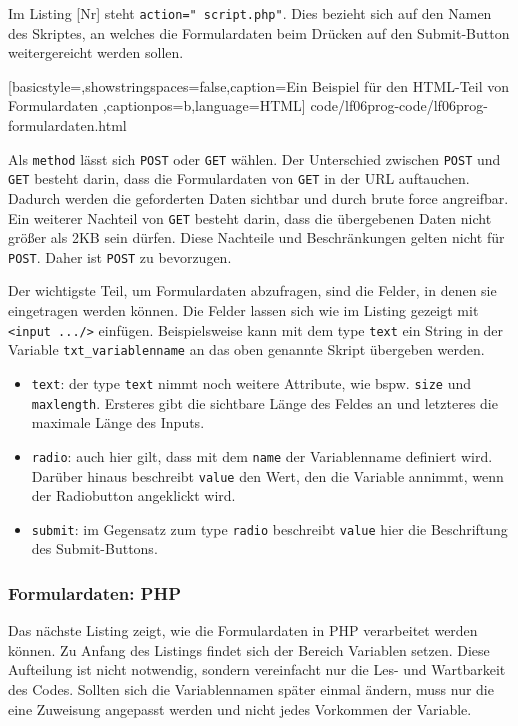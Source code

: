 Im Listing [Nr] steht \texttt{action="\ script.php"}. Dies bezieht sich auf den Namen des Skriptes, an welches die Formulardaten beim Drücken auf den Submit-Button weitergereicht werden sollen.


	[basicstyle=\small,showstringspaces=false,caption={Ein Beispiel für den HTML-Teil von Formulardaten}
	\label{lst:html-formulardaten},captionpos=b,language=HTML]
	{code/lf06prog-code/lf06prog-formulardaten.html}

Als \texttt{method} lässt sich \texttt{POST} oder \texttt{GET} wählen. Der Unterschied zwischen \texttt{POST} und \texttt{GET} besteht darin, dass die Formulardaten von \texttt{GET} in der URL auftauchen. Dadurch werden die geforderten Daten sichtbar und durch brute force angreifbar. Ein weiterer Nachteil von \texttt{GET} besteht darin, dass die übergebenen Daten nicht größer als 2KB sein dürfen. Diese Nachteile und Beschränkungen gelten nicht für \texttt{POST}. Daher ist \texttt{POST} zu bevorzugen.

Der wichtigste Teil, um Formulardaten abzufragen, sind die Felder, in denen sie eingetragen werden können. Die Felder lassen sich wie im Listing gezeigt mit \texttt{<input .../>} einfügen. Beispielsweise kann mit dem type \texttt{text} ein String in der Variable \texttt{txt\_variablenname} an das oben genannte Skript übergeben werden.
\begin{itemize}
	\item \texttt{text}: der type \texttt{text} nimmt noch weitere Attribute, wie bspw. \texttt{size} und \texttt{maxlength}. Ersteres gibt die sichtbare Länge des Feldes an und letzteres die maximale Länge des Inputs.
	\item \texttt{radio}: auch hier gilt, dass mit dem \texttt{name} der Variablenname definiert wird. Darüber hinaus beschreibt \texttt{value} den Wert, den die Variable annimmt, wenn der Radiobutton angeklickt wird.
	\item \texttt{submit}: im Gegensatz zum type \texttt{radio} beschreibt \texttt{value} hier die Beschriftung des Submit-Buttons.
\end{itemize} 

\subsubsection{Formulardaten: PHP}

Das nächste Listing zeigt, wie die Formulardaten in PHP verarbeitet werden können. Zu Anfang des Listings findet sich der Bereich \ql Variablen setzen\qr. Diese Aufteilung ist nicht notwendig, sondern vereinfacht nur die Les- und Wartbarkeit des Codes. Sollten sich die Variablennamen später einmal ändern, muss nur die eine Zuweisung angepasst werden und nicht jedes Vorkommen der Variable.

